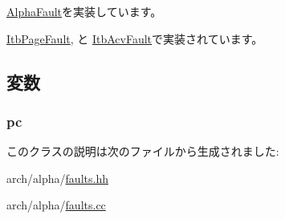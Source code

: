 \hyperlink{classAlphaISA_1_1AlphaFault_ac141ef2ab527bd4d5c079ddff2e8b4aa}{AlphaFault}を実装しています。

\hyperlink{classAlphaISA_1_1ItbPageFault_ae15c5d7ab0162821b93d668d0b225198}{ItbPageFault}, と \hyperlink{classAlphaISA_1_1ItbAcvFault_ae15c5d7ab0162821b93d668d0b225198}{ItbAcvFault}で実装されています。

\subsection{変数}
\hypertarget{classAlphaISA_1_1ItbFault_afed6bf9f08aaa7445161a391a719b7e4}{
\subsubsection[{pc}]{ {\bf pc}}}
\label{classAlphaISA_1_1ItbFault_afed6bf9f08aaa7445161a391a719b7e4}


このクラスの説明は次のファイルから生成されました:\begin{DoxyCompactItemize}
\item 
arch/alpha/\hyperlink{arch_2alpha_2faults_8hh}{faults.hh}\item 
arch/alpha/\hyperlink{arch_2alpha_2faults_8cc}{faults.cc}\end{DoxyCompactItemize}
